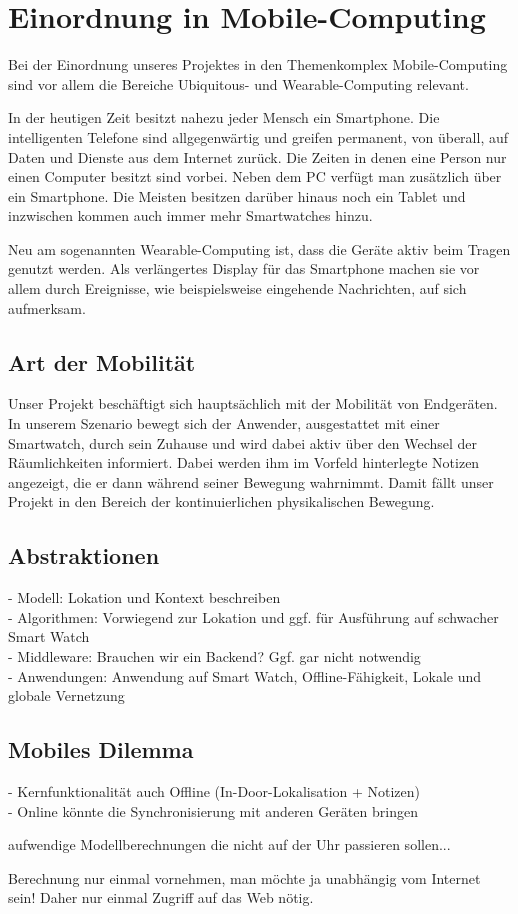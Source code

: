 \section{Einordnung in Mobile-Computing}
Bei der Einordnung unseres Projektes in den Themenkomplex Mobile-Computing sind vor allem die Bereiche Ubiquitous- und Wearable-Computing relevant. 

In der heutigen Zeit besitzt nahezu jeder Mensch ein Smartphone. Die intelligenten Telefone sind allgegenwärtig und greifen permanent, von überall, auf Daten und Dienste aus dem Internet zurück. Die Zeiten in denen eine Person nur einen Computer besitzt sind vorbei. Neben dem PC verfügt man zusätzlich über ein Smartphone. Die Meisten besitzen darüber hinaus noch ein Tablet und inzwischen kommen auch immer mehr Smartwatches hinzu.

Neu am sogenannten Wearable-Computing ist, dass die Geräte aktiv beim Tragen genutzt werden. Als verlängertes Display für das Smartphone machen sie vor allem durch Ereignisse, wie beispielsweise eingehende Nachrichten, auf sich aufmerksam. 

\subsection{Art der Mobilität}
Unser Projekt beschäftigt sich hauptsächlich mit der Mobilität von Endgeräten. In unserem Szenario bewegt sich der Anwender, ausgestattet mit einer Smartwatch, durch sein Zuhause und wird dabei aktiv über den Wechsel der Räumlichkeiten informiert. Dabei werden ihm im Vorfeld hinterlegte Notizen angezeigt, die er dann während seiner Bewegung wahrnimmt. Damit fällt unser Projekt in den Bereich der kontinuierlichen physikalischen Bewegung.

\subsection{Abstraktionen}
- Modell: Lokation und Kontext beschreiben
\\- Algorithmen: Vorwiegend zur Lokation und ggf. für Ausführung auf schwacher Smart Watch
\\- Middleware: Brauchen wir ein Backend? Ggf. gar nicht notwendig
\\- Anwendungen: Anwendung auf Smart Watch, Offline-Fähigkeit, Lokale und globale Vernetzung

\subsection{Mobiles Dilemma}
- Kernfunktionalität auch Offline (In-Door-Lokalisation + Notizen)
\\- Online könnte die Synchronisierung mit anderen Geräten bringen


aufwendige Modellberechnungen die nicht auf der Uhr passieren sollen...

Berechnung nur einmal vornehmen, man möchte ja unabhängig vom Internet sein! Daher nur einmal Zugriff auf das Web nötig.
